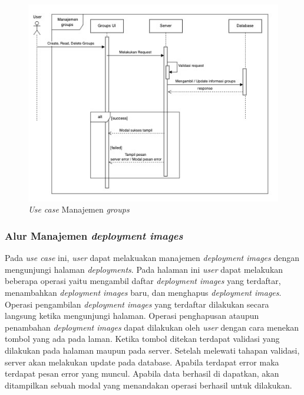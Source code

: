 \begin{figure}[h]
  \centering
  \includegraphics[width=1\textwidth]{resources/chapter-3/usecase/uc-09.jpg}
  \caption{\textit{Use case} Manajemen \textit{groups}}
  \label{fig:usecase-09}
\end{figure}

\pagebreak

\subsubsection{Alur Manajemen \textit{deployment images}}

Pada \textit{use case} ini, \textit{user} dapat melakuakan manajemen \textit{deployment images} dengan mengunjungi halaman \textit{deployments}. Pada halaman ini \textit{user} dapat melakukan beberapa operasi yaitu mengambil daftar \textit{deployment images} yang terdaftar, menambahkan \textit{deployment images} baru, dan menghapus \textit{deployment images}. Operasi pengambilan \textit{deployment images} yang terdaftar dilakukan secara langsung ketika mengunjungi halaman. Operasi penghapusan ataupun penambahan \textit{deployment images} dapat dilakukan oleh \textit{user} dengan cara menekan tombol yang ada pada laman. Ketika tombol ditekan terdapat validasi yang dilakukan pada halaman maupun pada server. Setelah melewati tahapan validasi, server akan melakukan update pada database. Apabila terdapat error maka terdapat pesan error yang muncul. Apabila data berhasil di dapatkan, akan ditampilkan sebuah modal yang menandakan operasi berhasil untuk dilakukan.

